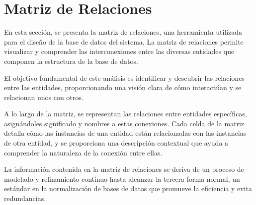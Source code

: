 \chapter{Matriz de Relaciones}\label{cap:apendix-matrix-relation}

En esta sección, se presenta la matriz de relaciones, una herramienta utilizada para el diseño de la base de datos del sistema. La matriz de relaciones permite visualizar y comprender las interconexiones entre las diversas entidades que componen la estructura de la base de datos.

El objetivo fundamental de este análisis es identificar y descubrir las relaciones entre las entidades, proporcionando una visión clara de cómo interactúan y se relacionan unos con otros.

A lo largo de la matriz, se representan las relaciones entre entidades específicas, asignándoles significado y nombres a estas conexiones. Cada celda de la matriz detalla cómo las instancias de una entidad están relacionadas con las instancias de otra entidad, y se proporciona una descripción contextual que ayuda a comprender la naturaleza de la conexión entre ellas.

La información contenida en la matriz de relaciones se deriva de un proceso de modelado y refinamiento continuo hasta alcanzar la tercera forma normal, un estándar en la normalización de bases de datos que promueve la eficiencia y evita redundancias.


